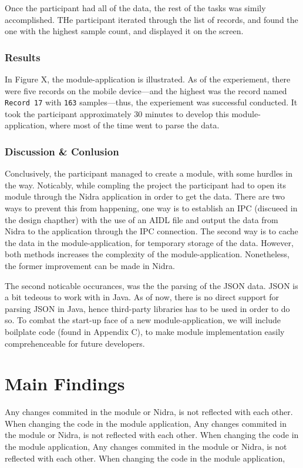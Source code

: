 Once the participant had all of the data, the rest of the tasks was simily accomplished. THe participant iterated through the list of records, and found the one with the highest sample count, and displayed it on the screen. 

\subsubsection{Results}

In Figure X, the module-application is illustrated. As of the experiement, there were five records on the mobile device---and the highest was the record named \verb|Record 17| with \verb|163| samples---thus, the experiement was successful conducted. It took the participant approximately 30 minutes to develop this module-application, where most of the time went to parse the data.

\subsubsection{Discussion \& Conlusion}

Conclusively, the participant managed to create a module, with some hurdles in the way. Noticably, while compling the project the participant had to open its module through the Nidra application in order to get the data. There are two ways to prevent this from happening, one way is to establish an IPC (discueed in the design chapther) with the use of an AIDL file and output the data from Nidra to the application through the IPC connection. The second way is to cache the data in the module-application, for temporary storage of the data. However, both methods increases the complexity of the module-application. Nonetheless, the former improvement can be made in Nidra.

The second noticable occurances, was the the parsing of the JSON data. JSON is a bit tedeous to work with in Java. As of now, there is no direct support for parsing JSON in Java, hence third-party libraries has to be used in order to do so. To combat the start-up face of a new module-application, we will include boilplate code (found in Appendix C), to make module implementation easily comprehenceable for future developers.


\section{Main Findings}
Any changes commited in the module or Nidra, is not reflected with each other. When changing the code in the module application, Any changes commited in the module or Nidra, is not reflected with each other. When changing the code in the module application, Any changes commited in the module or Nidra, is not reflected with each other. When changing the code in the module application, 